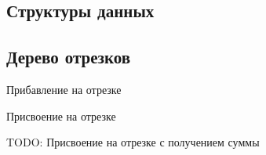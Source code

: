 \documentclass[a4paper]{article}
\begin{document}
\begin{multicols*}{2}
		
		\section{Структуры данных}
		\subsection{Дерево отрезков}
		
		 Прибавление на отрезке
		 
		 Присвоение на отрезке
		 
		 TODO: Присвоение на отрезке с получением суммы
	\end{multicols*}
\end{document}
